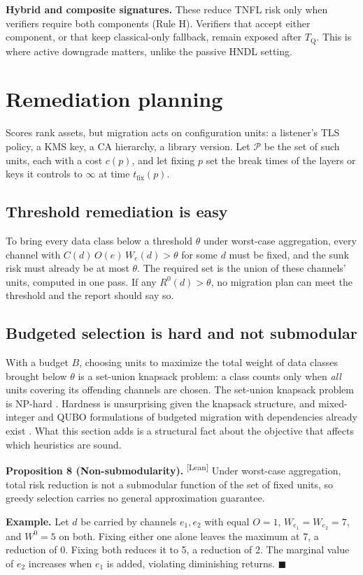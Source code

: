 \documentclass[conference]{IEEEtran}
\newcommand{\Tq}{T_{\mathrm{Q}}}
\newcommand{\tfix}{t_{\mathrm{fix}}}
\providecommand{\gt}{}\renewcommand{\gt}{>}
\newcommand{\leantag}{\textsuperscript{\textsf{\scriptsize[Lean]}}}
\newenvironment{envblock}{\par\smallskip\noindent\ignorespaces}{\par\smallskip}
\begin{document}
\textbf{Hybrid and composite signatures.} These reduce TNFL risk only when verifiers require both components (Rule H). Verifiers that accept either component, or that keep classical-only fallback, remain exposed after $\Tq$. This is where active downgrade matters, unlike the passive HNDL setting.

\section{Remediation planning}\label{sec:8}

Scores rank assets, but migration acts on configuration units: a listener's TLS policy, a KMS key, a CA hierarchy, a library version. Let $\mathcal{P}$ be the set of such units, each with a cost $c(p)$, and let fixing $p$ set the break times of the layers or keys it controls to $\infty$ at time $\tfix(p)$.

\subsection{Threshold remediation is easy}\label{sec:8.1}

To bring every data class below a threshold $\theta$ under worst-case aggregation, every channel with $C(d)\,O(e)\,W_e(d) \gt \theta$ for some $d$ must be fixed, and the sunk risk must already be at most $\theta$. The required set is the union of these channels' units, computed in one pass. If any $R^0(d) \gt \theta$, no migration plan can meet the threshold and the report should say so.

\subsection{Budgeted selection is hard and not submodular}\label{sec:8.2}

With a budget $B$, choosing units to maximize the total weight of data classes brought below $\theta$ is a set-union knapsack problem: a class counts only when \emph{all} units covering its offending channels are chosen. The set-union knapsack problem is NP-hard \cite{goldschmidt1994}. Hardness is unsurprising given the knapsack structure, and mixed-integer and QUBO formulations of budgeted migration with dependencies already exist \cite{figueira2026}. What this section adds is a structural fact about the objective that affects which heuristics are sound.

\begin{envblock}

\textbf{Proposition 8 (Non-submodularity).} \leantag{} Under worst-case aggregation, total risk reduction is not a submodular function of the set of fixed units, so greedy selection carries no general approximation guarantee.

\textbf{Example.} Let $d$ be carried by channels $e_1, e_2$ with equal $O = 1$, $W_{e_1} = W_{e_2} = 7$, and $W^0 = 5$ on both. Fixing either one alone leaves the maximum at 7, a reduction of 0. Fixing both reduces it to 5, a reduction of 2. The marginal value of $e_2$ increases when $e_1$ is added, violating diminishing returns. \hfill$\blacksquare$
\end{envblock}
\end{document}
